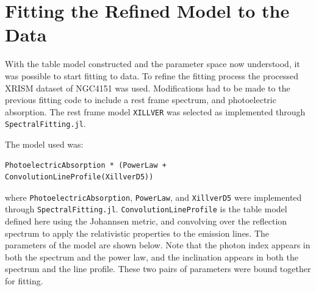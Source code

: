 \documentclass[
  letterpaper,
  DIV=11,
  numbers=noendperiod]{scrreprt}
\begin{document}
\chapter{Fitting the Refined Model to the
Data}\label{fitting-the-refined-model-to-the-data}

With the table model constructed and the parameter space now understood,
it was possible to start fitting to data. To refine the fitting process
the processed XRISM dataset of NGC4151 was used. Modifications had to be
made to the previous fitting code to include a rest frame spectrum, and
photoelectric absorption. The rest frame model \texttt{XILLVER} was
selected as implemented through \texttt{SpectralFitting.jl}.

The model used was:

\begin{verbatim}
PhotoelectricAbsorption * (PowerLaw + ConvolutionLineProfile(XillverD5))
\end{verbatim}

where \texttt{PhotoelectricAbsorption}, \texttt{PowerLaw}, and
\texttt{XillverD5} were implemented through \texttt{SpectralFitting.jl}.
\texttt{ConvolutionLineProfile} is the table model defined here using
the Johannsen metric, and convolving over the reflection spectrum to
apply the relativistic properties to the emission lines. The parameters
of the model are shown below. Note that the photon index appears in both
the spectrum and the power law, and the inclination appears in both the
spectrum and the line profile. These two pairs of parameters were bound
together for fitting.
\end{document}
